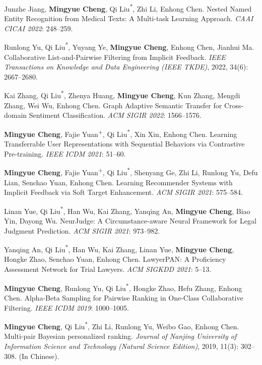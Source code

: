 \documentclass[UTF8,fontset=fandol,scheme=plain,11pt,a4paper]{ctexart}
\newcommand{\pubentry}[1]{\item \begin{minipage}[t]{\linewidth}#1\end{minipage}}
\begin{document}
\begin{publist}[start=54]
\pubentry{Junzhe Jiang, \textbf{Mingyue Cheng}, Qi Liu\textsuperscript{*}, Zhi Li, Enhong Chen. Nested Named Entity Recognition from Medical Texts: A Multi-task Learning Approach. \emph{CAAI CICAI 2022}: 248--259.}

\pubentry{Runlong Yu, Qi Liu\textsuperscript{*}, Yuyang Ye, \textbf{Mingyue Cheng}, Enhong Chen, Jianhui Ma. Collaborative List-and-Pairwise Filtering from Implicit Feedback. \emph{IEEE Transactions on Knowledge and Data Engineering (IEEE TKDE)}, 2022, 34(6): 2667--2680.}

\pubentry{Kai Zhang, Qi Liu\textsuperscript{*}, Zhenya Huang, \textbf{Mingyue Cheng}, Kun Zhang, Mengdi Zhang, Wei Wu, Enhong Chen. Graph Adaptive Semantic Transfer for Cross-domain Sentiment Classification. \emph{ACM SIGIR 2022}: 1566--1576.}

\pubentry{\textbf{Mingyue Cheng}, Fajie Yuan\textsuperscript{+}, Qi Liu\textsuperscript{*}, Xin Xin, Enhong Chen. Learning Transferrable User Representations with Sequential Behaviors via Contrastive Pre-training. \emph{IEEE ICDM 2021}: 51--60.}

\pubentry{\textbf{Mingyue Cheng}, Fajie Yuan\textsuperscript{+}, Qi Liu\textsuperscript{*}, Shenyang Ge, Zhi Li, Runlong Yu, Defu Lian, Senchao Yuan, Enhong Chen. Learning Recommender Systems with Implicit Feedback via Soft Target Enhancement. \emph{ACM SIGIR 2021}: 575--584.}

\pubentry{Linan Yue, Qi Liu\textsuperscript{*}, Han Wu, Kai Zhang, Yanqing An, \textbf{Mingyue Cheng}, Biao Yin, Dayong Wu. NeurJudge: A Circumstance-aware Neural Framework for Legal Judgment Prediction. \emph{ACM SIGIR 2021}: 973--982.}

\pubentry{Yanqing An, Qi Liu\textsuperscript{*}, Han Wu, Kai Zhang, Linan Yue, \textbf{Mingyue Cheng}, Hongke Zhao, Senchao Yuan, Enhong Chen. LawyerPAN: A Proficiency Assessment Network for Trial Lawyers. \emph{ACM SIGKDD 2021}: 5--13.}

\pubentry{\textbf{Mingyue Cheng}, Runlong Yu, Qi Liu\textsuperscript{*}, Hongke Zhao, Hefu Zhang, Enhong Chen. Alpha-Beta Sampling for Pairwise Ranking in One-Class Collaborative Filtering. \emph{IEEE ICDM 2019}: 1000--1005.}

\pubentry{\textbf{Mingyue Cheng}, Qi Liu\textsuperscript{*}, Zhi Li, Runlong Yu, Weibo Gao, Enhong Chen. Multi-pair Bayesian personalized ranking. \emph{Journal of Nanjing University of Information Science and Technology (Natural Science Edition)}, 2019, 11(3): 302--308. (In Chinese).}

\end{publist}
\end{document}
